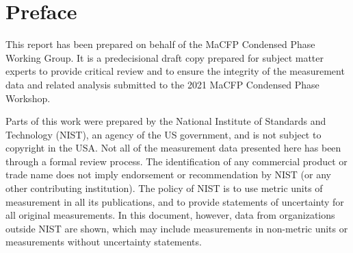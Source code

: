 \documentclass{book}
\begin{document}
\newpage
\thispagestyle{empty}

\frontmatter

\chapter{Preface}
\thispagestyle{fancy}
This report has been prepared on behalf of the MaCFP Condensed Phase Working Group. It is a predecisional draft copy prepared for subject matter experts to provide critical review and to ensure the integrity of the measurement data and related analysis submitted to the 2021 MaCFP Condensed Phase Workshop.

Parts of this work were prepared by the National Institute of Standards and Technology (NIST), an agency of the US government, and is not subject to copyright in the USA. Not all of the measurement data presented here has been through a formal review process. The identification of any commercial product or trade name does not imply endorsement or recommendation by NIST (or any other contributing institution). The policy of NIST is to use metric units of measurement in all its publications, and to provide statements of uncertainty for all original measurements. In this document, however, data from organizations outside NIST are shown, which may include measurements in non-metric units or measurements without uncertainty statements.



\newpage
\thispagestyle{fancy}
\tableofcontents

\mainmatter
\pagestyle{fancy}
\end{document}
